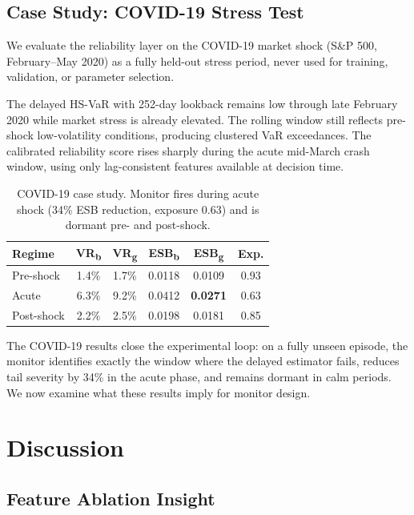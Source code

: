 \documentclass[sigconf]{acmart}
\begin{document}
\subsection{Case Study: COVID-19 Stress Test}

We evaluate the reliability layer on the COVID-19 market shock (S\&P 500, February--May 2020) as a fully held-out stress period, never used for training, validation, or parameter selection.

The delayed HS-VaR with 252-day lookback remains low through late February 2020 while market stress is already elevated. The rolling window still reflects pre-shock low-volatility conditions, producing clustered VaR exceedances. The calibrated reliability score rises sharply during the acute mid-March crash window, using only lag-consistent features available at decision time.


\begin{table}[t]
\caption{COVID-19 case study. Monitor fires during acute shock (34\%
ESB reduction, exposure 0.63) and is dormant pre- and post-shock.}
\label{tab:covid}
\small
\begin{tabular}{lccccc}
\toprule
\textbf{Regime} & \textbf{VR\textsubscript{b}} & \textbf{VR\textsubscript{g}} & \textbf{ESB\textsubscript{b}} & \textbf{ESB\textsubscript{g}} & \textbf{Exp.} \\
\midrule
Pre-shock  & 1.4\% & 1.7\% & 0.0118 & 0.0109 & 0.93 \\
Acute      & 6.3\% & 9.2\% & 0.0412 & \textbf{0.0271} & 0.63 \\
Post-shock & 2.2\% & 2.5\% & 0.0198 & 0.0181 & 0.85 \\
\bottomrule
\end{tabular}
\end{table}



The COVID-19 results close the experimental loop: on a fully unseen
episode, the monitor identifies exactly the window where the delayed
estimator fails, reduces tail severity by 34\% in the acute phase,
and remains dormant in calm periods. We now examine what these results
imply for monitor design.

\section{Discussion}
\label{sec:discussion}

\subsection{Feature Ablation Insight}
\end{document}
